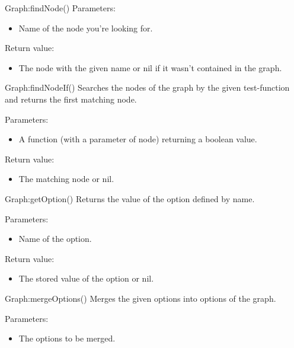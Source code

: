 \begin{luacommand}{{Graph:findNode}()}
Parameters:
\begin{itemize}
	\item[]  \subitem Name of the node you're looking for.
\end{itemize}


Return value:
\begin{itemize} \item[] The node with the given name or nil if it wasn't contained in the graph. \end{itemize}


\end{luacommand}\begin{luacommand}{{Graph:findNodeIf}()}
Searches the nodes of the graph by the given test-function and returns the first matching node.

Parameters:
\begin{itemize}
	\item[]  \subitem A function (with a parameter of node) returning a boolean value.
\end{itemize}


Return value:
\begin{itemize} \item[] The matching node or nil. \end{itemize}


\end{luacommand}\begin{luacommand}{{Graph:getOption}()}
Returns the value of the option defined by name.

Parameters:
\begin{itemize}
	\item[]  \subitem Name of the option.
\end{itemize}


Return value:
\begin{itemize} \item[] The stored value of the option or nil. \end{itemize}


\end{luacommand}\begin{luacommand}{{Graph:mergeOptions}()}
Merges the given options into options of the graph.

Parameters:
\begin{itemize}
	\item[]  \subitem The options to be merged.
\end{itemize}




\end{luacommand}
